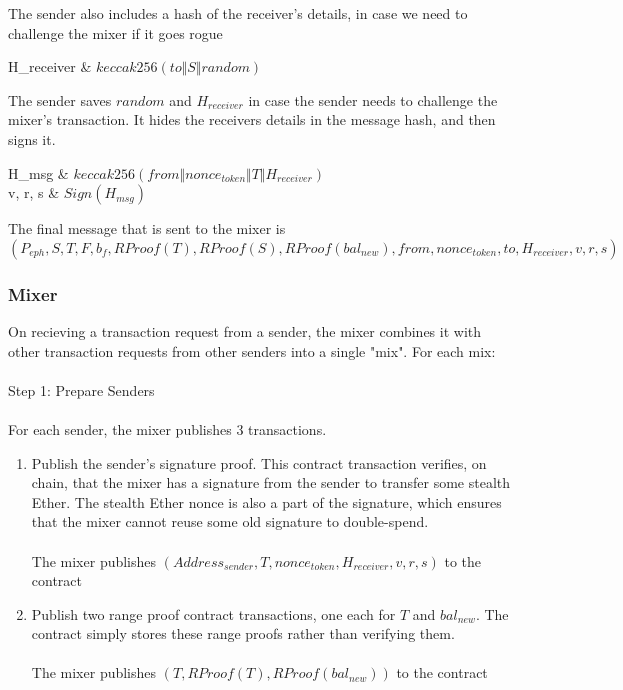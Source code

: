 \documentclass{article}
\makeatletter
\newenvironment{conditions*}
  {\par\vspace{\abovedisplayskip}\noindent
   \tabularx{\columnwidth}{>{$}l<{$} @{${}={}$} >{\raggedright\arraybackslash}X}}
  {\endtabularx\par\vspace{\belowdisplayskip}}
\makeatother
\begin{document}
The sender also includes a hash of the receiver's details, in case we need to challenge the mixer if it goes rogue
\begin{conditions*}
H_{receiver} & $keccak256(to \Vert S \Vert random)$ \\
\end{conditions*}

The sender saves $random$ and $H_{receiver}$ in case the sender needs to challenge the mixer's transaction. It hides the receivers details in the message hash, and then signs it.
\begin{conditions*}
H_{msg} & $keccak256(from \Vert nonce_{token} \Vert T \Vert H_{receiver})$ \\
v, r, s & $Sign(H_{msg})$
\end{conditions*}

The final message that is sent to the mixer is 
\begin{equation*}
(P_{eph}, S, T, F, b_f, RProof(T), RProof(S), RProof(bal_{new}), from, nonce_{token}, to, H_{receiver}, v, r, s)
\end{equation*}

\subsubsection{Mixer}
On recieving a transaction request from a sender, the mixer combines it with other transaction requests from other senders into a single "mix". For each mix:
\paragraph{}
Step 1: Prepare Senders
\paragraph{}
For each sender, the mixer publishes 3 transactions. 
\begin{enumerate}
\item Publish the sender's signature proof. This contract transaction verifies, on chain, that the mixer has a signature from the sender to transfer some stealth Ether. The stealth Ether nonce is also a part of the signature, which ensures that the mixer cannot reuse some old signature to double-spend. 
\paragraph{} 
The mixer publishes $(Address_{sender}, T, nonce_{token}, H_{receiver}, v, r, s)$ to the contract
\item Publish two range proof contract transactions, one each for $T$ and $bal_{new}$. The contract simply stores these range proofs rather than verifying them. 
\paragraph{} 
The mixer publishes $(T, RProof(T), RProof(bal_{new}))$ to the contract
\end{enumerate}
\end{document}
